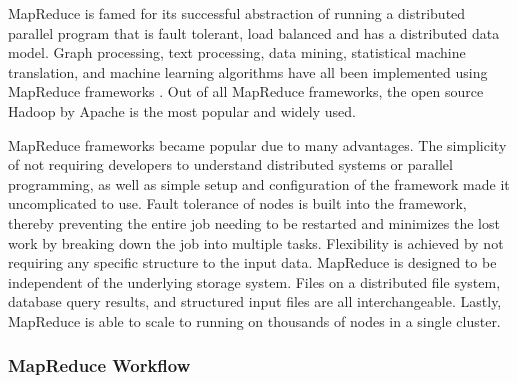 \documentclass[12pt]{article}
\begin{document}
MapReduce is famed for its successful abstraction of running a distributed parallel program that is fault tolerant, load balanced and has a distributed data model. Graph processing, text processing, data mining, statistical machine translation, and machine learning algorithms have all been implemented using MapReduce frameworks \cite{dean2008mapreduce}. Out of all MapReduce frameworks, the open source Hadoop by Apache is the most popular and widely used.

MapReduce frameworks became popular due to many advantages. The simplicity of not requiring developers to understand distributed systems or parallel programming, as well as simple setup and configuration of the framework made it uncomplicated to use. Fault tolerance of nodes is built into the framework, thereby preventing the entire job needing to be restarted and minimizes the lost work by breaking down the job into multiple tasks. Flexibility is achieved by not requiring any specific structure to the input data. MapReduce is designed to be independent of the underlying storage system. Files on a distributed file system, database query results, and structured input files are all interchangeable. Lastly, MapReduce is able to scale to running on thousands of nodes in a single cluster.


\subsubsection{MapReduce Workflow}
\end{document}
